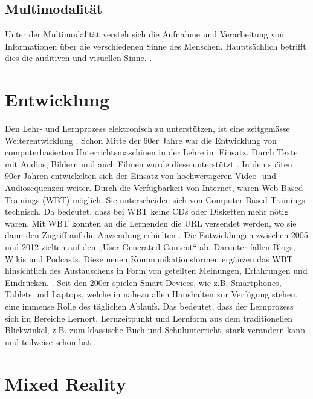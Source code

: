 \subsection{Multimodalität}
		 Unter der Multimodalität versteh sich die Aufnahme und Verarbeitung  von Informationen über die verschiedenen Sinne des Menschen. Hauptsächlich betrifft dies die auditiven und visuellen Sinne.  \cite[vgl.][]{elearning.multimodalitaet}. 

\section{Entwicklung}
Den Lehr- und Lernprozess elektronisch zu unterstützen, ist eine zeitgemässe Weiterentwicklung \cite[vgl.][S.5]{Dittler}. Schon Mitte der 60er Jahre war die Entwicklung von computerbasierten Unterrichtsmaschinen in der Lehre im Einsatz. Durch Texte mit Audios, Bildern und auch Filmen wurde diese unterstützt \cite[vgl.][S.12]{Dittler}. In den späten 90er Jahren entwickelten sich der Einsatz von hochwertigeren Video- und Audiosequenzen weiter. Durch die Verfügbarkeit von Internet, waren Web-Based-Trainings (WBT) möglich. Sie unterscheiden sich von Computer-Based-Trainings technisch. Da bedeutet, dass bei WBT keine CDs oder Disketten mehr nötig waren. Mit WBT konnten an die Lernenden die URL versendet werden, wo sie dann den Zugriff auf die Anwendung erhielten \cite[vgl.][S.23]{Dittler}. Die Entwicklungen zwischen 2005 und 2012 zielten auf den „User-Generated Content“ ab. Darunter fallen Blogs, Wikis und Podcasts. Diese neuen Kommunikationsformen ergänzen das WBT hinsichtlich des Austauschens in Form von geteilten Meinungen, Erfahrungen und Eindrücken. \cite[vgl.][S.31]{Dittler}. Seit den 200er spielen Smart Devices, wie z.B. Smartphones, Tablets und Laptops, welche in nahezu allen Haushalten zur Verfügung stehen, eine immense Rolle des täglichen Ablaufs. Das bedeutet, dass der Lernprozess sich im Bereiche Lernort, Lernzeitpunkt und Lernform aus dem traditionellen Blickwinkel, z.B. zum klassische Buch und Schulunterricht, stark verändern kann und teilweise schon hat \cite[vgl.][S.51]{Dittler}. 

\section{Mixed Reality}

